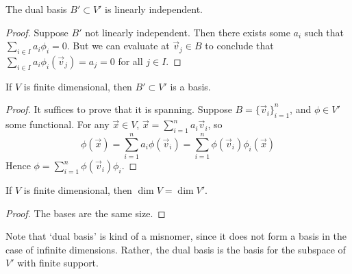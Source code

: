 \begin{lemma}
    The dual basis \(B' \subset V'\) is linearly independent.
\end{lemma}
\begin{proof}
    Suppose \(B'\) not linearly independent.
    Then there exists some \(a_i\) such that \(\sum_{i \in I} a_i \phi_i = 0\).
    But we can evaluate at \(\vec{v}_j \in B\) to conclude that
    \(\sum_{i \in I} a_i \phi_i(\vec{v}_j) = a_j = 0\) for all \(j \in I\).
\end{proof}
\begin{proposition}\label{prop:finite-dim-dual-basis}
    If \(V\) is finite dimensional,
    then \(B' \subset V'\) is a basis.
\end{proposition}
\begin{proof}
    It suffices to prove that it is spanning.
    Suppose \(B = {\{\vec{v}_i\}}_{i=1}^n\),
    and \(\phi \in V'\) some functional.
    For any \(\vec{x} \in V\),
    \(\vec{x} = \sum_{i=1}^n a_i \vec{v}_i\),
    so
    \begin{equation*}
        \phi(\vec{x}) = \sum_{i=1}^n a_i \phi(\vec{v}_i)
        = \sum_{i=1}^n \phi(\vec{v}_i) \phi_i(\vec{x})
    \end{equation*}
    Hence \(\phi = \sum_{i=1}^n \phi(\vec{v}_i) \phi_i\).
\end{proof}
\begin{corollary}
    If \(V\) is finite dimensional,
    then \(\dim V = \dim V'\).
\end{corollary}
\begin{proof}
    The bases are the same size.
\end{proof}
\begin{remark}
    Note that `dual basis' is kind of a misnomer,
    since it does not form a basis in the case of infinite dimensions.
    Rather, the dual basis is the basis for the subspace of \(V'\)
    with finite support.
\end{remark}

